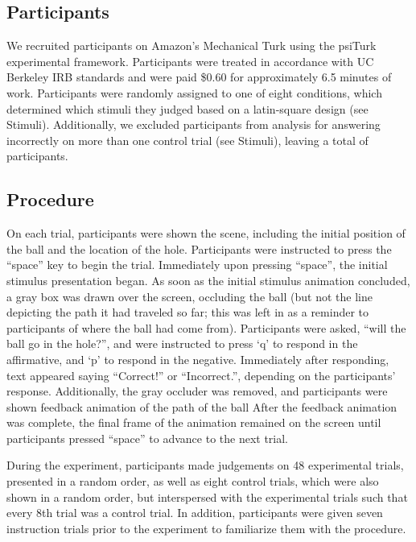 \documentclass[10pt,letterpaper]{article}
\begin{document}
\subsection{Participants}

We recruited \HoleNumComplete{} participants on Amazon's Mechanical Turk using the psiTurk \cite{McDonnell12} experimental framework.
Participants were treated in accordance with UC Berkeley IRB standards and were paid \$0.60 for approximately 6.5 minutes of work.
Participants were randomly assigned to one of eight conditions, which determined which stimuli they judged based on a latin-square design (see Stimuli). 
Additionally, we excluded \HoleNumFailed{} participants from analysis for answering incorrectly on more than one control trial (see Stimuli), leaving a total of \HoleNumOk{} participants.

\subsection{Procedure}

On each trial, participants were shown the scene, including the initial position of the ball and the location of the hole. 
Participants were instructed to press the ``space'' key to begin the trial. 
Immediately upon pressing ``space'', the initial stimulus presentation began. 
As soon as the initial stimulus animation concluded, a gray box was drawn over the screen, occluding the ball (but not the line depicting the path it had traveled so far; this was left in as a reminder to participants of where the ball had come from). 
Participants were asked, ``will the ball go in the hole?'', and were instructed to press `q' to respond in the affirmative, and `p' to respond in the negative. 
Immediately after responding, text appeared saying ``Correct!'' or ``Incorrect.'', depending on the participants' response.
Additionally, the gray occluder was removed, and participants were shown feedback animation of the path of the ball
After the feedback animation was complete, the final frame of the animation remained on the screen until participants pressed ``space'' to advance to the next trial. 

During the experiment, participants made judgements on 48 experimental trials, presented in a random order, as well as eight control trials, which were also shown in a random order, but interspersed with the experimental trials such that every 8th trial was a control trial.
In addition, participants were given seven instruction trials prior to the experiment to familiarize them with the procedure.
\end{document}
